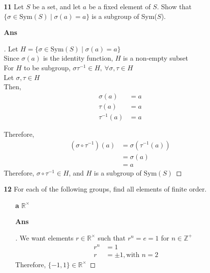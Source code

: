 \documentclass[paper=usletter, fontsize=12pt]{article}
\begin{document}
\begin{itemize}
\begin{itemize}
            \item[\textbf{11}]
            Let $S$ be a set, and let $a$ be a fixed element of $S$. Show that
            $\{\sigma \in \text{Sym}(S) \mid \sigma(a)=a \}$ is a subgroup of
            Sym($S$).
            \item[\textbf{Ans}]
            \begin{proof}[\unskip\nopunct]
                Let $H=\{\sigma \in \text{Sym}(S) \mid \sigma(a)=a \}$\\
                Since $\sigma(a)$ is the identity function, $H$ is a non-empty subset\\
                For $H$ to be subgroup, $\sigma\tau^{-1} \in H, \ \forall \sigma,\tau \in H$\\
                Let $\sigma, \tau \in H$\\
                Then,
                \begin{align*}
                    \sigma(a) & = a\\
                    \tau(a) & = a\\
                    \tau^{-1}(a) & = a
                \end{align*}

                Therefore,
                \begin{align*}
                    (\sigma \circ \tau^{-1})(a) & = \sigma(\tau^{-1}(a))\\
                    & = \sigma(a)\\
                    & = a
                \end{align*}
                Therefore, $\sigma \circ \tau^{-1} \in H$, and $H$ is a
                subgroup of $\text{Sym}(S)$ \qedhere

            \end{proof}
            \vspace{0.2in}

            \item[\textbf{12}] For each of the following groups, find all
            elements of finite order.
            \begin{enumerate}

                \item[\textbf{a}] $\mathbb{R}^{\times}$
                \item[\textbf{Ans}]
                \begin{proof}[\unskip\nopunct]
                    We want elements $r \in \mathbb{R}^{\times}$ such that $r^n
                    =e=1$ for $n \in \mathbb{Z}^{+}$
                    \begin{align*}
                        r^n & = 1 \\
                        r & = \pm 1, \text{with } n = 2
                    \end{align*}
                    Therefore, $\{-1, 1\} \in \mathbb{R}^{\times}$ \qedhere
                \end{proof}
                \vspace{0.2in}


\end{enumerate}
\end{itemize}
\end{itemize}
\end{document}

